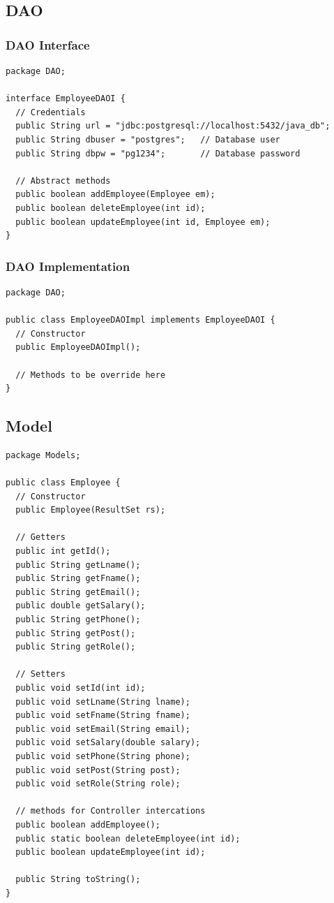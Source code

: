\documentclass[12pt]{article}
\begin{document}
\pagebreak

\subsection{DAO}
\subsubsection{DAO Interface}
\begin{lstlisting}
package DAO;

interface EmployeeDAOI {
  // Credentials
  public String url = "jdbc:postgresql://localhost:5432/java_db";
  public String dbuser = "postgres";   // Database user
  public String dbpw = "pg1234";       // Database password

  // Abstract methods
  public boolean addEmployee(Employee em);
  public boolean deleteEmployee(int id);
  public boolean updateEmployee(int id, Employee em);
}
\end{lstlisting}

\subsubsection{DAO Implementation}
\begin{lstlisting}
package DAO;

public class EmployeeDAOImpl implements EmployeeDAOI {
  // Constructor
  public EmployeeDAOImpl();
  
  // Methods to be override here
}
\end{lstlisting}

\pagebreak

\subsection{Model}
\begin{lstlisting}
package Models;

public class Employee {
  // Constructor
  public Employee(ResultSet rs);
  
  // Getters
  public int getId();
  public String getLname();
  public String getFname();
  public String getEmail();
  public double getSalary();
  public String getPhone();
  public String getPost();
  public String getRole();
  
  // Setters
  public void setId(int id);
  public void setLname(String lname);
  public void setFname(String fname);
  public void setEmail(String email);
  public void setSalary(double salary);
  public void setPhone(String phone);
  public void setPost(String post);
  public void setRole(String role);

  // methods for Controller intercations
  public boolean addEmployee();
  public static boolean deleteEmployee(int id);
  public boolean updateEmployee(int id);

  public String toString();
}
\end{lstlisting}
\end{document}
